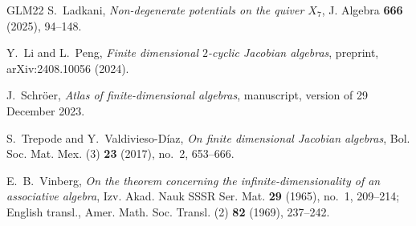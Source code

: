 \documentclass[11pt,letterpaper,reqno]{amsart}
\theoremstyle{definition}
\begin{document}
\begin{thebibliography}{GLM22}
		S.~Ladkani,
		\emph{Non-degenerate potentials on the quiver $X_7$},
		J. Algebra \textbf{666} (2025), 94--148.
		
		Y.~Li and L.~Peng,
		\emph{Finite dimensional $2$-cyclic Jacobian algebras},
		preprint, arXiv:2408.10056 (2024).
		
		J.~Schr\"oer,
		\emph{Atlas of finite-dimensional algebras},
		manuscript, version of 29 December 2023.
		
		S.~Trepode and Y.~Valdivieso-D\'iaz,
		\emph{On finite dimensional Jacobian algebras},
		Bol. Soc. Mat. Mex. (3) \textbf{23} (2017), no.~2, 653--666.
		
		E.~B.~Vinberg,
		\emph{On the theorem concerning the infinite-dimensionality of an
			associative algebra},
		Izv. Akad. Nauk SSSR Ser. Mat. \textbf{29} (1965), no.~1, 209--214;
		English transl., Amer. Math. Soc. Transl. (2) \textbf{82} (1969), 237--242.
		
	\end{thebibliography}
	
	
\end{document}
